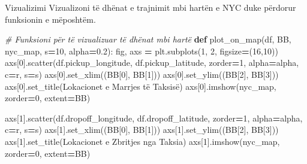 \documentclass[
  ignorenonframetext,
]{beamer}
\newenvironment{Shaded}{\begin{snugshade}}{\end{snugshade}}
\newcommand{\CommentTok}[1]{\textcolor[rgb]{0.56,0.35,0.01}{\textit{#1}}}
\newcommand{\DecValTok}[1]{\textcolor[rgb]{0.00,0.00,0.81}{#1}}
\newcommand{\FloatTok}[1]{\textcolor[rgb]{0.00,0.00,0.81}{#1}}
\newcommand{\KeywordTok}[1]{\textcolor[rgb]{0.13,0.29,0.53}{\textbf{#1}}}
\newcommand{\NormalTok}[1]{#1}
\newcommand{\OperatorTok}[1]{\textcolor[rgb]{0.81,0.36,0.00}{\textbf{#1}}}
\newcommand{\StringTok}[1]{\textcolor[rgb]{0.31,0.60,0.02}{#1}}
\begin{document}
\begin{frame}[fragile]{Vizualizimi}
\protect\hypertarget{vizualizimi}{}
Vizualizoni të dhënat e trajnimit mbi hartën e NYC duke përdorur
funksionin e mëposhtëm.


\begin{Shaded}
\begin{Highlighting}[]
\CommentTok{\# Funksioni për të vizualizuar të dhënat mbi hartë}
\KeywordTok{def}\NormalTok{ plot\_on\_map(df, BB, nyc\_map, s}\OperatorTok{=}\DecValTok{10}\NormalTok{, alpha}\OperatorTok{=}\FloatTok{0.2}\NormalTok{):}
\NormalTok{    fig, axs }\OperatorTok{=}\NormalTok{ plt.subplots(}\DecValTok{1}\NormalTok{, }\DecValTok{2}\NormalTok{, figsize}\OperatorTok{=}\NormalTok{(}\DecValTok{16}\NormalTok{,}\DecValTok{10}\NormalTok{))}
\NormalTok{    axs[}\DecValTok{0}\NormalTok{].scatter(df.pickup\_longitude, df.pickup\_latitude, zorder}\OperatorTok{=}\DecValTok{1}\NormalTok{, alpha}\OperatorTok{=}\NormalTok{alpha, c}\OperatorTok{=}\StringTok{\textquotesingle{}r\textquotesingle{}}\NormalTok{, s}\OperatorTok{=}\NormalTok{s)}
\NormalTok{    axs[}\DecValTok{0}\NormalTok{].set\_xlim((BB[}\DecValTok{0}\NormalTok{], BB[}\DecValTok{1}\NormalTok{]))}
\NormalTok{    axs[}\DecValTok{0}\NormalTok{].set\_ylim((BB[}\DecValTok{2}\NormalTok{], BB[}\DecValTok{3}\NormalTok{]))}
\NormalTok{    axs[}\DecValTok{0}\NormalTok{].set\_title(}\StringTok{\textquotesingle{}Lokacionet e Marrjes të Taksisë\textquotesingle{}}\NormalTok{)}
\NormalTok{    axs[}\DecValTok{0}\NormalTok{].imshow(nyc\_map, zorder}\OperatorTok{=}\DecValTok{0}\NormalTok{, extent}\OperatorTok{=}\NormalTok{BB)}

\NormalTok{    axs[}\DecValTok{1}\NormalTok{].scatter(df.dropoff\_longitude, df.dropoff\_latitude, zorder}\OperatorTok{=}\DecValTok{1}\NormalTok{, alpha}\OperatorTok{=}\NormalTok{alpha, c}\OperatorTok{=}\StringTok{\textquotesingle{}r\textquotesingle{}}\NormalTok{, s}\OperatorTok{=}\NormalTok{s)}
\NormalTok{    axs[}\DecValTok{1}\NormalTok{].set\_xlim((BB[}\DecValTok{0}\NormalTok{], BB[}\DecValTok{1}\NormalTok{]))}
\NormalTok{    axs[}\DecValTok{1}\NormalTok{].set\_ylim((BB[}\DecValTok{2}\NormalTok{], BB[}\DecValTok{3}\NormalTok{]))}
\NormalTok{    axs[}\DecValTok{1}\NormalTok{].set\_title(}\StringTok{\textquotesingle{}Lokacionet e Zbritjes nga Taksia\textquotesingle{}}\NormalTok{)}
\NormalTok{    axs[}\DecValTok{1}\NormalTok{].imshow(nyc\_map, zorder}\OperatorTok{=}\DecValTok{0}\NormalTok{, extent}\OperatorTok{=}\NormalTok{BB)}
\end{Highlighting}
\end{Shaded}
\end{frame}
\end{document}
